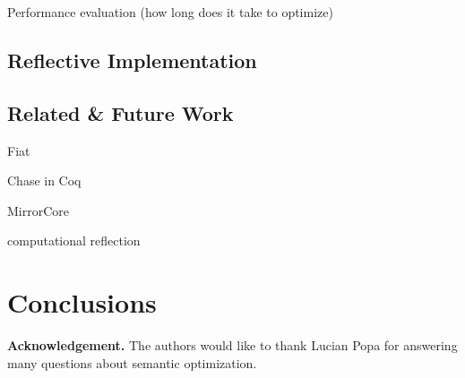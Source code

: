 \documentclass[preprint]{sigplanconf}
\begin{document}
Performance evaluation (how long does it take to optimize)

\subsection{Reflective Implementation}

\subsection{Related \& Future Work}
Fiat~\cite{deleware2015fiat}

Chase in Coq~\cite{}

MirrorCore~\cite{malecha2014thesis}

computational reflection~\cite{}

\section{Conclusions}




{\bf Acknowledgement.}  The authors would like to thank Lucian Popa for answering many questions about semantic optimization.



\end{document}
